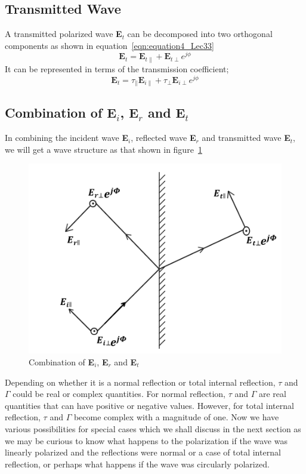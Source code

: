 \subsection{Transmitted Wave}
A transmitted polarized wave \textbf{E$_t$} can be decomposed into two orthogonal components as shown in equation~\ref{eqn:equation4_Lec33}
\begin{equation}
\textbf{E}_t = \textbf{E}_{t\parallel} + \textbf{E}_{t\perp} e^{j\phi}
\label{eqn:equation4_Lec33}
\end{equation}
It can be represented in terms of the transmission coefficient;	
\begin{equation}
\textbf{E}_t = \tau_\parallel \textbf{E}_{i\parallel} + \tau_\perp\textbf{E}_{i\perp} e^{j\phi}
\end{equation}	

\subsection{Combination of \textbf{E$_i$}, \textbf{E$_r$} and \textbf{E$_t$}}
In combining the incident wave \textbf{E$_i$}, reflected wave \textbf{E$_r$} and transmitted wave \textbf{E$_t$}, we will get a wave structure as that shown in figure~\ref{fig:mcben}	
\begin{figure}[h]
\centering
\includegraphics[width=1\linewidth]{graphics/orthogonal_components}
\caption{Combination of \textbf{E$_i$}, \textbf{E$_r$} and \textbf{E$_t$}}
\label{fig:mcben}
\end{figure}

Depending on whether it is a normal reflection or total internal reflection, $\tau$ and $\Gamma$ could be real or complex quantities. For normal reflection, $\tau$ and $\Gamma$ are real quantities that can have positive or negative values. However, for total internal reflection, $\tau$ and $\Gamma$ become complex with a magnitude of one. Now we have various possibilities for special cases which we shall discuss in the next section as we may be curious to know what happens to the polarization if the wave was linearly polarized and the reflections were normal or a case of total internal reflection, or perhaps what happens if the wave was circularly polarized.

